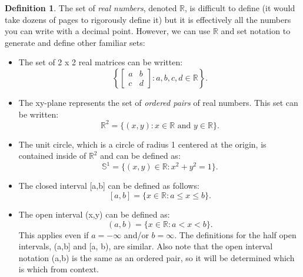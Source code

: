\documentclass{amsart} %
\theoremstyle{definition} %
\newtheorem*{dfn}{Definition} %
\theoremstyle{proposition} %
\theoremstyle{remark} %
\begin{document}
\begin{dfn}
 \quad The set of \emph{real numbers}, denoted $\mathbb{R}$, is difficult to define (it would take dozens of pages to rigorously define it) but it is effectively all the numbers you can write with a decimal point. However, we can use $\mathbb{R}$ and set notation to generate and define other familiar sets:

    \begin{itemize}
      \item The set of 2 x 2 real matrices can be written:
            $$ \left\{\begin{bmatrix}
                  a & b \\
                  c & d
                \end{bmatrix} : a, b, c, d \in \mathbb{R}\right\}. $$ %
      \item The xy-plane represents the set of \emph{ordered pairs} of real numbers. This set can be written:
            \[ \mathbb{R}^2 = \{(x,y) : x \in \mathbb{R} \text{ and } y \in \mathbb{R}\}. \]
      \item The unit circle, which is a circle of radius 1 centered at the origin, is contained inside of $\mathbb{R}^2$ and can be defined as:
            \[ \mathbb{S}^1 = \{(x,y) \in \mathbb{R} : x^2 + y^2 = 1\}.  \]
      \item The closed interval [a,b] can be defined as follows:
            \[ [a,b] = \{x \in \mathbb{R} : a \le x \le b\}.  \]
      \item The open interval (x,y) can be defined as:
            \[ (a,b) = \{x \in \mathbb{R} : a < x < b\}. \]
            This applies even if $a = -\infty$ and/or $b = \infty$. The definitions for the half open intervals, (a,b] and [a, b), are similar. Also note that the           open interval notation (a,b) is the same as an ordered pair, so it will be determined which is which from context.
    \end{itemize}

\end{dfn}
\end{document}
